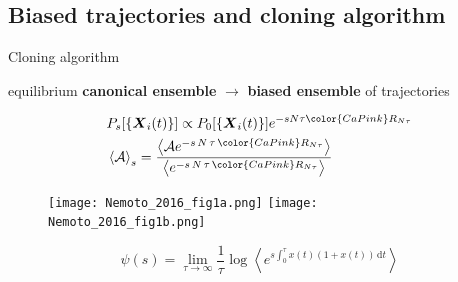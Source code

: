 \documentclass{beamer}
\renewcommand{\FigureFrom}[2]{
  [{\usebeamercolor[fg]{caption source} from:} \fullcite{#1}\ifblank{#2}{}{ (Fig.~#2)}]
}
\begin{document}
\subsection{Biased trajectories and cloning algorithm}

\begin{frame}{Cloning algorithm}


\vspace{-20pt}
\begin{center}
equilibrium \textbf{canonical ensemble} $\to$ \textbf{biased ensemble} of trajectories
\end{center}
\begin{eqnarray}
& P_s[\{\boldsymbol{X}_i(t)\}] \propto P_0[\{\boldsymbol{X}_i(t)\}] e^{-s N \tau {\color{CaPink} R_{N\tau}}}\\
& \left<\mathcal{A}\right>_s = \frac{\left<\mathcal{A} e^{-s \, N \, \tau \, {\color{CaPink} R_{N\tau}}}\right>}{\left<e^{-s \, N \, \tau \, {\color{CaPink} R_{N\tau}}}\right>}
\end{eqnarray}


\pause
\vspace{-10pt}
\begin{figure}
\centering
\texttt{[image: Nemoto\_2016\_fig1a.png]}
\texttt{[image: Nemoto\_2016\_fig1b.png]}
\end{figure}
\vspace{-5pt}
\begin{equation}
\psi(s) = \lim_{\tau \to \infty} \frac{1}{\tau} \log \left<e^{s \int_0^{\tau} x(t)(1 + x(t)) \, \text{d}t}\right>
\end{equation}

\end{frame}
\end{document}
